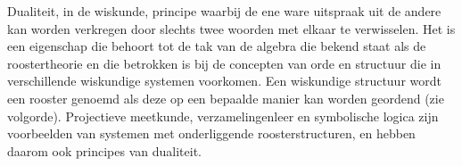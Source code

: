 \documentclass{article}
\begin{document}
	Dualiteit, in de wiskunde, principe waarbij de ene ware uitspraak uit de andere kan worden verkregen door slechts twee woorden met elkaar te verwisselen. Het is een eigenschap die behoort tot de tak van de algebra die bekend staat als de roostertheorie en die betrokken is bij de concepten van orde en structuur die in verschillende wiskundige systemen voorkomen. Een wiskundige structuur wordt een rooster genoemd als deze op een bepaalde manier kan worden geordend (zie volgorde). Projectieve meetkunde, verzamelingenleer en symbolische logica zijn voorbeelden van systemen met onderliggende roosterstructuren, en hebben daarom ook principes van dualiteit.
%	
%	
%	
%	
\end{document}
